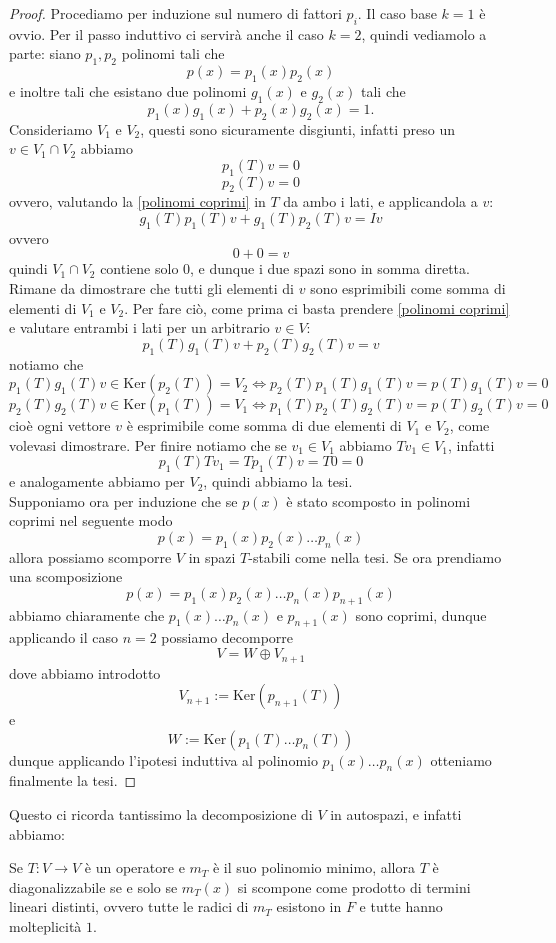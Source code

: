 \documentclass[11pt]{scrartcl}
\renewcommand{\ker}[1]{\text{Ker}\left(#1\right)}
\begin{document}
   	 \begin{proof}
   	 	Procediamo per induzione sul numero di fattori $p_i$. Il caso base $k=1$ è ovvio. Per il passo induttivo ci servirà anche il caso $k=2$, quindi vediamolo a parte: siano $p_1,p_2$ polinomi tali che 
   	 	$$p(x)=p_1(x)p_2(x)$$
   	 	e inoltre tali che esistano due polinomi $g_1(x)$ e $g_2(x)$ tali che
   	 	\begin{equation}\label{polinomi coprimi}
   	 		p_1(x)g_1(x)+p_2(x)g_2(x)=1.
   	 	\end{equation}
   	 	Consideriamo $V_1$ e $V_2$, questi sono sicuramente disgiunti, infatti preso un $v\in V_1\cap V_2$ abbiamo
   	 	$$p_1(T)v=0$$
   	 	$$p_2(T)v=0$$
   	 	ovvero, valutando la \ref{polinomi coprimi} in $T$ da ambo i lati, e applicandola a $v$:
   	 	$$g_1(T)p_1(T)v+g_1(T)p_2(T)v=Iv$$
   	 	ovvero
   	 	$$0+0=v$$
   	 	quindi $V_1\cap V_2$ contiene solo $0$, e dunque i due spazi sono in somma diretta. Rimane da dimostrare che tutti gli elementi di $v$ sono esprimibili come somma di elementi di $V_1$ e $V_2$. Per fare ciò, come prima ci basta prendere \ref{polinomi coprimi} e valutare entrambi i lati per un arbitrario $v\in V$:
   	 	$$p_1(T)g_1(T)v+p_2(T)g_2(T)v=v$$
   	 	notiamo che  
   	 	$$p_1(T)g_1(T)v \in \ker{p_2(T)}=V_2 \iff p_2(T)p_1(T)g_1(T)v=p(T)g_1(T)v=0$$
   	 	$$p_2(T)g_2(T)v \in \ker{p_1(T)}=V_1 \iff p_1(T)p_2(T)g_2(T)v=p(T)g_2(T)v=0$$
   	 	cioè ogni vettore $v$ è esprimibile come somma di due elementi di $V_1$ e $V_2$, come volevasi dimostrare. Per finire notiamo che se $v_1\in V_1$ abbiamo $Tv_1\in V_1$, infatti
   	 	$$p_1(T)Tv_1=Tp_1(T)v=T0=0$$
   	 	e analogamente abbiamo per $V_2$, quindi abbiamo la tesi. \\
   	 	Supponiamo ora per induzione che se $p(x)$ è stato scomposto in polinomi coprimi nel seguente modo
   	 	$$p(x)=p_1(x)p_2(x)\dots p_n(x)$$
   	 	allora possiamo scomporre $V$ in spazi $T$-stabili come nella tesi. Se ora prendiamo una scomposizione 
   	 	$$p(x)=p_1(x)p_2(x)\dots p_n(x)p_{n+1}(x)$$
   	 	abbiamo chiaramente che $p_1(x)\dots p_n(x)$ e $p_{n+1}(x)$ sono coprimi, dunque applicando il caso $n=2$ possiamo decomporre 
   	 	$$V=W\oplus V_{n+1}$$
   	 	dove abbiamo introdotto 
   	 	$$V_{n+1}:=\ker{p_{n+1}(T)}$$
   	 	e
   	 	$$W:=\ker{p_1(T)\dots p_n(T)}$$
   	 	dunque applicando l'ipotesi induttiva al polinomio $p_1(x)\dots p_n(x)$ otteniamo finalmente la tesi.
   	 \end{proof}
   	 Questo ci ricorda tantissimo la decomposizione di $V$ in autospazi, e infatti abbiamo:
   	 \begin{corollary}
   	 	Se $T:V\to V$ è un operatore e $m_T$ è il suo polinomio minimo, allora $T$ è diagonalizzabile se e solo se $m_T(x)$ si scompone come prodotto di termini lineari distinti, ovvero tutte le radici di $m_T$ esistono in $F$ e tutte hanno molteplicità $1$.
   	 \end{corollary}
\end{document}
